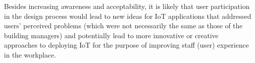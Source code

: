 Besides increasing awareness and acceptability, it is likely that user
participation in the design process would lead to new ideas for IoT
applications that addressed users’ perceived problems (which were not
necessarily the same as those of the building managers) and
potentially lead to more innovative or creative approaches to
deploying IoT for the purpose of improving staff (user) experience in
the workplace.  


